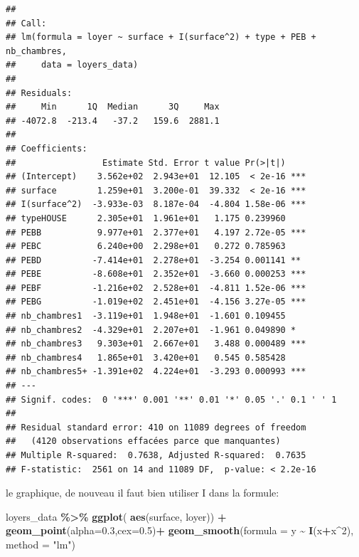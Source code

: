 \documentclass[
]{book}
\newenvironment{Shaded}{\begin{snugshade}}{\end{snugshade}}
\newcommand{\AttributeTok}[1]{\textcolor[rgb]{0.13,0.29,0.53}{#1}}
\newcommand{\DecValTok}[1]{\textcolor[rgb]{0.00,0.00,0.81}{#1}}
\newcommand{\FloatTok}[1]{\textcolor[rgb]{0.00,0.00,0.81}{#1}}
\newcommand{\FunctionTok}[1]{\textcolor[rgb]{0.13,0.29,0.53}{\textbf{#1}}}
\newcommand{\NormalTok}[1]{#1}
\newcommand{\SpecialCharTok}[1]{\textcolor[rgb]{0.81,0.36,0.00}{\textbf{#1}}}
\newcommand{\StringTok}[1]{\textcolor[rgb]{0.31,0.60,0.02}{#1}}
\begin{document}
\begin{verbatim}
## 
## Call:
## lm(formula = loyer ~ surface + I(surface^2) + type + PEB + nb_chambres, 
##     data = loyers_data)
## 
## Residuals:
##     Min      1Q  Median      3Q     Max 
## -4072.8  -213.4   -37.2   159.6  2881.1 
## 
## Coefficients:
##                 Estimate Std. Error t value Pr(>|t|)    
## (Intercept)    3.562e+02  2.943e+01  12.105  < 2e-16 ***
## surface        1.259e+01  3.200e-01  39.332  < 2e-16 ***
## I(surface^2)  -3.933e-03  8.187e-04  -4.804 1.58e-06 ***
## typeHOUSE      2.305e+01  1.961e+01   1.175 0.239960    
## PEBB           9.977e+01  2.377e+01   4.197 2.72e-05 ***
## PEBC           6.240e+00  2.298e+01   0.272 0.785963    
## PEBD          -7.414e+01  2.278e+01  -3.254 0.001141 ** 
## PEBE          -8.608e+01  2.352e+01  -3.660 0.000253 ***
## PEBF          -1.216e+02  2.528e+01  -4.811 1.52e-06 ***
## PEBG          -1.019e+02  2.451e+01  -4.156 3.27e-05 ***
## nb_chambres1  -3.119e+01  1.948e+01  -1.601 0.109455    
## nb_chambres2  -4.329e+01  2.207e+01  -1.961 0.049890 *  
## nb_chambres3   9.303e+01  2.667e+01   3.488 0.000489 ***
## nb_chambres4   1.865e+01  3.420e+01   0.545 0.585428    
## nb_chambres5+ -1.391e+02  4.224e+01  -3.293 0.000993 ***
## ---
## Signif. codes:  0 '***' 0.001 '**' 0.01 '*' 0.05 '.' 0.1 ' ' 1
## 
## Residual standard error: 410 on 11089 degrees of freedom
##   (4120 observations effacées parce que manquantes)
## Multiple R-squared:  0.7638, Adjusted R-squared:  0.7635 
## F-statistic:  2561 on 14 and 11089 DF,  p-value: < 2.2e-16
\end{verbatim}

le graphique, de nouveau il faut bien utiliser I dans la formule:

\begin{Shaded}
\begin{Highlighting}[]
\NormalTok{loyers\_data }\SpecialCharTok{\%\textgreater{}\%}
  \FunctionTok{ggplot}\NormalTok{( }\FunctionTok{aes}\NormalTok{(surface, loyer)) }\SpecialCharTok{+}
  \FunctionTok{geom\_point}\NormalTok{(}\AttributeTok{alpha=}\FloatTok{0.3}\NormalTok{,}\AttributeTok{cex=}\FloatTok{0.5}\NormalTok{)}\SpecialCharTok{+}
  \FunctionTok{geom\_smooth}\NormalTok{(}\AttributeTok{formula =}\NormalTok{ y }\SpecialCharTok{\textasciitilde{}} \FunctionTok{I}\NormalTok{(x}\SpecialCharTok{+}\NormalTok{x}\SpecialCharTok{\^{}}\DecValTok{2}\NormalTok{), }\AttributeTok{method =} \StringTok{"lm"}\NormalTok{)}
\end{Highlighting}
\end{Shaded}
\end{document}
